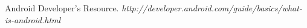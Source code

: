 \begin{thebibliography}{99}
 Android Developer's Resource. {\em http://developer.android.com/guide/basics/what-is-android.html}

\end{thebibliography}